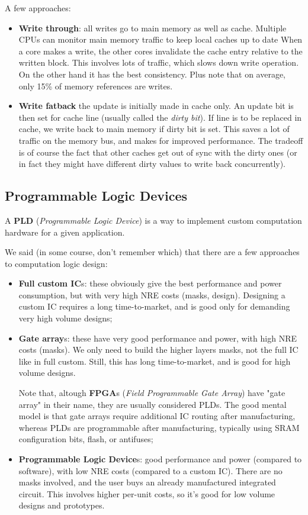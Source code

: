 \documentclass[a4paper,11pt]{article}
\begin{document}
A few approaches:
\begin{itemize}
	\item \textbf{Write through}: all writes go to main memory as well as cache.
	      Multiple CPUs can monitor main memory traffic to keep local caches up to date
	      When a core makes a write, the other cores invalidate the cache entry relative to the written block. This involves lots of traffic, which slows down write operation.
	      On the other hand it has the best consistency.
	      Plus note that on average, only 15\% of memory references are writes.
	\item \textbf{Write fatback} the update is initially made in cache only. An update bit is then set for cache line (usually called the \textit{dirty bit}).
	      If line is to be replaced in cache, we write back to main memory if dirty bit is set.
	      This saves a lot of traffic on the memory bus, and makes for improved performance.
	      The tradeoff is of course the fact that other caches get out of sync with the dirty ones (or in fact they might have different dirty values to write back concurrently).
\end{itemize}

\subsection{Programmable Logic Devices}

A \textbf{PLD} (\textit{Programmable Logic Device}) is a way to implement custom computation hardware for a given application.

We said (in some course, don't remember which) that there are a few approaches to computation logic design:
\begin{itemize}
	\item \textbf{Full custom IC}s: these obviously give the best performance and power consumption, but with very high NRE costs (masks, design). Designing a custom IC requires a long time-to-market, and is good only for demanding very high volume designs;
	\item \textbf{Gate array}s: these have very good performance and power, with high NRE costs (masks). We only need to build the higher layers masks, not the full IC like in full custom. Still, this has long time-to-market, and is good for high volume designs.

	      Note that, altough \textbf{FPGA}s (\textit{Field Programmable Gate Array}) have "gate array" in their name, they are usually considered PLDs.
	      The good mental model is that gate arrays require additional IC routing after manufacturing, whereas PLDs are programmable after manufacturing, typically using SRAM configuration bits, flash, or antifuses;
	\item \textbf{Programmable Logic Device}s: good performance and power (compared to software), with low NRE costs (compared to a custom IC).
	      There are no masks involved, and the user buys an already manufactured integrated circuit.
	      This involves higher per-unit costs, so it's good for low volume designs and prototypes.
\end{itemize}
\end{document}
